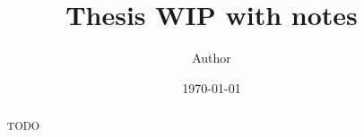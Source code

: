 \documentclass{article}
\numberwithin{equation}{section}
\numberwithin{algorithm}{section}
\begin{document}

\title{Thesis WIP with notes}
\author{Author}
\date{\today}
\maketitle

\clearpage

\begin{abstract}
TODO
\end{abstract}
\clearpage

\setcounter{tocdepth}{2}
\tableofcontents

\clearpage

\end{document}
